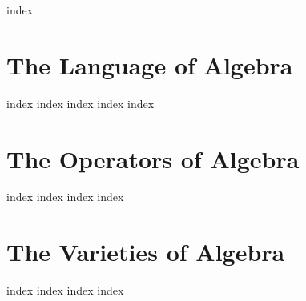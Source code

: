 \documentclass[12pt,twoside,letterpaper]{memoir}
\begin{document}
% 
\cleardoublepage


\mainmatter%


{index}

\part{The Language of Algebra}
{index}
{index}
{index}
{index}
{index}

\part{The Operators of Algebra}
{index}
{index}
{index}
{index}

\part{The Varieties of Algebra}
{index}
{index}
{index}
{index}
\end{document}
